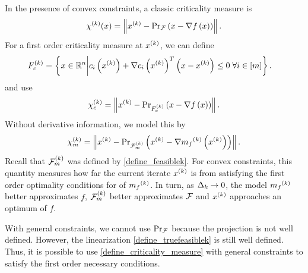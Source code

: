 In the presence of convex constraints, a classic \cite{Conejo:2013:GCT:2620806.2621814} \cite{ConnGoulToin00} criticality measure is
\begin{align*}
\chi^{(k)}(x) = \left\|x^{(k)} - {\textrm{Pr}}_{{\mathcal F}}\left(x- \nabla f\left(x\right)\right)\right\|.
\end{align*}
For a first order criticality measure at $x^{(k)}$, we can define
\begin{align}
{F_c^{(k)}} &= \left\{ x \in \mathbb R^n \bigg| c_i\left(x^{(k)}\right) + \nabla c_i\left(x^{(k)}\right)^T \left(x - x^{(k)}\right) \le 0 \; \forall i \in [m] \right\}. \label{define_truefeasiblek}
\end{align}
and use
\begin{align*}
\chi_c^{(k)} = \left\|x^{(k)} - {\textrm{Pr}}_{{F_c^{(k)}}}\left(x- \nabla f\left(x\right)\right)\right\|.
\end{align*}
Without derivative information, we model this by
\begin{align}
\label{define_criticality_measure}
{\chi_m^{(k)}} = \left\|x^{(k)} - {\textrm{Pr}}_{{\mathcal F_m^{(k)}}}\left(x^{(k)}- \nabla {{m}_f}^{(k)}\left(x^{(k)}\right)\right)\right\|.
\end{align}
Recall that ${\mathcal F_m^{(k)}}$ was defined by \cref{define_feasiblek}.
For convex constraints, this quantity measures how far the current iterate $x^{(k)}$ is from satisfying the first order optimality conditions for of ${{m}_f}^{(k)}$.
In turn, as $\Delta_k \to 0$, the model ${{m}_f}^{(k)}$ better approximates $f$, ${\mathcal F_m^{(k)}}$ better approximates ${\mathcal F}$ and $x^{(k)}$ approaches an optimum of $f$.

With general constraints, we cannot use ${\textrm{Pr}}_{{\mathcal F}}$ because the projection is not well defined.
However, the linearization \cref{define_truefeasiblek} is still well defined.
Thus, it is possible to use \cref{define_criticality_measure} with general constraints to satisfy the first order necessary conditions.





